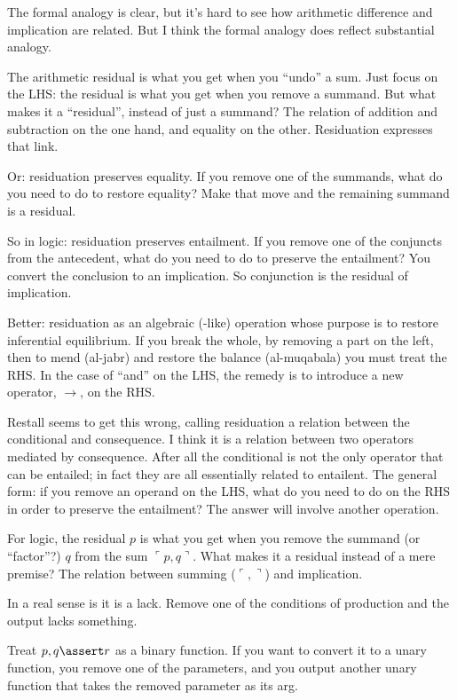 \documentclass{article}
\begin{document}
The formal analogy is clear, but it's hard to see how arithmetic
difference and implication are related. But I think the formal analogy
does reflect substantial analogy.

The arithmetic residual is what you get when you ``undo'' a sum. Just
focus on the LHS: the residual is what you get when you remove a
summand. But what makes it a ``residual'', instead of just a summand?
The relation of addition and subtraction on the one hand, and equality
on the other. Residuation expresses that link.

Or: residuation preserves equality. If you remove one of the summands,
what do you need to do to restore equality? Make that move and the remaining summand is a residual.

So in logic: residuation preserves entailment. If you remove one of
the conjuncts from the antecedent, what do you need to do to preserve
the entailment?  You convert the conclusion to an implication. So conjunction is the residual of implication.

Better: residuation as an algebraic (-like) operation whose purpose is
to restore inferential equilibrium. If you break the whole, by
removing a part on the left, then to mend (al-jabr) and restore the
balance (al-muqabala) you must treat the RHS. In the case of ``and''
on the LHS, the remedy is to introduce a new operator, \(→\), on the
RHS.

Restall seems to get this wrong, calling residuation a relation
between the conditional and consequence. I think it is a relation
between two operators mediated by consequence. After all the
conditional is not the only operator that can be entailed; in fact
they are all essentially related to entailent. The general form: if
you remove an operand on the LHS, what do you need to do on the RHS in
order to preserve the entailment? The answer will involve another
operation.

For logic, the residual \(p\) is what you get when you remove the
summand (or ``factor''?) \(q\) from the sum \(\ulcorner
p,q\urcorner\). What makes it a residual instead of a mere premise?
The relation between summing (\(\ulcorner ,\urcorner\)) and
implication.

In a real sense is it is a lack. Remove one of the conditions of
production and the output lacks something.

Treat \(p,q\linfer r\) as a binary function. If you want to convert it
to a unary function, you remove one of the parameters, and you output
another unary function that takes the removed parameter as its arg.
\end{document}
